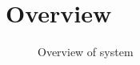 \section{Overview}



\begin{figure}[H]
    \centering
    \caption{Overview of system}
    \label{fig:overview}
\end{figure}
